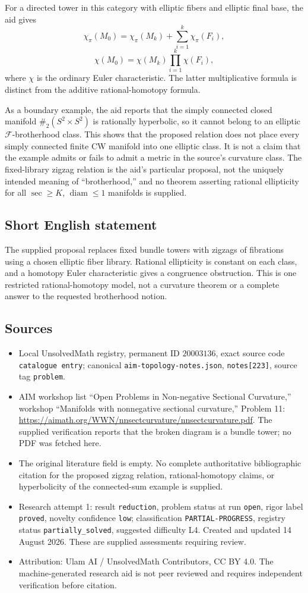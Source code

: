 \documentclass[11pt]{article}
\begin{document}
For a directed tower in this category with elliptic fibers and elliptic final base, the aid gives
\[
 \chi_\pi(M_0)=\chi_\pi(M_k)+\sum_{i=1}^k\chi_\pi(F_i),
\]
\[
 \chi(M_0)=\chi(M_k)\prod_{i=1}^k\chi(F_i),
\]
where \(\chi\) is the ordinary Euler characteristic. The latter multiplicative formula is distinct from the additive rational-homotopy formula.

As a boundary example, the aid reports that the simply connected closed manifold \(\#_2(S^2\times S^2)\) is rationally hyperbolic, so it cannot belong to an elliptic \(\mathcal F\)-brotherhood class. This shows that the proposed relation does not place every simply connected finite CW manifold into one elliptic class. It is not a claim that the example admits or fails to admit a metric in the source's curvature class. The fixed-library zigzag relation is the aid's particular proposal, not the uniquely intended meaning of ``brotherhood,'' and no theorem asserting rational ellipticity for all \(\sec\geq K\), \(\operatorname{diam}\leq1\) manifolds is supplied.
\subsection{Short English statement}
The supplied proposal replaces fixed bundle towers with zigzags of fibrations using a chosen elliptic fiber library. Rational ellipticity is constant on each class, and a homotopy Euler characteristic gives a congruence obstruction. This is one restricted rational-homotopy model, not a curvature theorem or a complete answer to the requested brotherhood notion.
\subsection{Sources}
\begin{itemize}
\item Local UnsolvedMath registry, permanent ID \(20003136\), exact source code \texttt{catalogue entry}; canonical \texttt{aim-topology-notes.json}, \texttt{notes[223]}, source tag \texttt{problem}.
\item AIM workshop list ``Open Problems in Non-negative Sectional Curvature,'' workshop ``Manifolds with nonnegative sectional curvature,'' Problem 11: \url{https://aimath.org/WWN/nnsectcurvature/nnsectcurvature.pdf}. The supplied verification reports that the broken diagram is a bundle tower; no PDF was fetched here.
\item The original literature field is empty. No complete authoritative bibliographic citation for the proposed zigzag relation, rational-homotopy claims, or hyperbolicity of the connected-sum example is supplied.
\item Research attempt 1: result \texttt{reduction}, problem status at run \texttt{open}, rigor label \texttt{proved}, novelty confidence \texttt{low}; classification \texttt{PARTIAL-PROGRESS}, registry status \texttt{partially\_solved}, suggested difficulty L4. Created and updated 14 August 2026. These are supplied assessments requiring review.
\item Attribution: Ulam AI / UnsolvedMath Contributors, CC BY 4.0. The machine-generated research aid is not peer reviewed and requires independent verification before citation.
\end{itemize}
\end{document}
